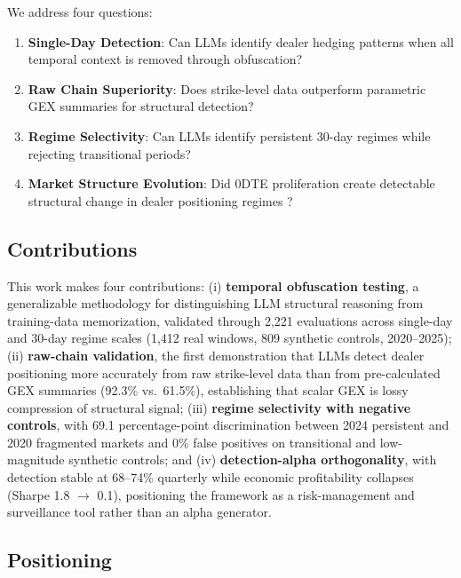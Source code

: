 We address four questions:
\begin{enumerate}
\item \textbf{Single-Day Detection}: Can LLMs identify dealer hedging patterns when all temporal context is removed through obfuscation?
\item \textbf{Raw Chain Superiority}: Does strike-level data outperform parametric GEX summaries for structural detection?
\item \textbf{Regime Selectivity}: Can LLMs identify persistent 30-day regimes while rejecting transitional periods?
\item \textbf{Market Structure Evolution}: Did 0DTE proliferation create detectable structural change in dealer positioning regimes \citep{adams2025zerodte}?
\end{enumerate}

\subsection{Contributions}

This work makes four contributions: (i) \textbf{temporal obfuscation testing}, a generalizable methodology for distinguishing LLM structural reasoning from training-data memorization, validated through 2{,}221 evaluations across single-day and 30-day regime scales (1{,}412 real windows, 809 synthetic controls, 2020--2025); (ii) \textbf{raw-chain validation}, the first demonstration that LLMs detect dealer positioning more accurately from raw strike-level data than from pre-calculated GEX summaries (92.3\% vs.\ 61.5\%), establishing that scalar GEX is lossy compression of structural signal; (iii) \textbf{regime selectivity with negative controls}, with 69.1 percentage-point discrimination between 2024 persistent and 2020 fragmented markets and 0\% false positives on transitional and low-magnitude synthetic controls; and (iv) \textbf{detection-alpha orthogonality}, with detection stable at 68--74\% quarterly while economic profitability collapses (Sharpe 1.8 $\rightarrow$ 0.1), positioning the framework as a risk-management and surveillance tool rather than an alpha generator.

\subsection{Positioning}
\label{sec:introduction:positioning}

